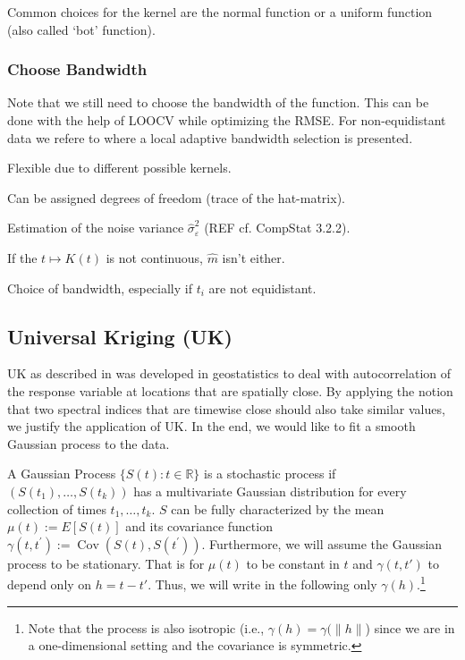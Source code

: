 		Common choices for the kernel are the normal function or a uniform function (also called `bot' function). 
		\subsubsection*{Choose Bandwidth}
		Note that we still need to choose the bandwidth of the function. This can be done with the help of LOOCV while optimizing the RMSE. For non-equidistant data we refere to \cite{brockmannLocallyAdaptiveBandwidth1993} where a local adaptive bandwidth selection is presented.

		\begin{my_pros_cons_table}{
				\item Flexible due to different possible kernels.
				\item Can be assigned degrees of freedom (trace of the hat-matrix).
				\item Estimation of the noise variance $\hat \sigma_\varepsilon^2$ (REF cf. CompStat 3.2.2).
			}{
				\item If the $t \mapsto K(t)$ is not continuous, $\hat m $ isn't either.
				\item Choice of bandwidth, especially if $t_i$ are not equidistant.
			}
		\end{my_pros_cons_table}


	\subsection{Universal Kriging (UK)}
		\label{sec:Kriging}

		UK as described in \cite{diggleGaussianModelsGeostatistical2007} was developed in geostatistics to deal with autocorrelation of the response variable at locations that are spatially close. By applying the notion that two spectral indices that are timewise close should also take similar values, we justify the application of UK. In the end, we would like to fit a smooth Gaussian process to the data.

		A Gaussian Process $\{S(t) : t\in \mathbb R\} $ is a stochastic process if $(S(t_1),\dots,S(t_k))$ has a multivariate Gaussian distribution for every collection of times ${t_1, \dots , t_k}$. $S$ can be fully characterized by the mean $\mu(t):=E[S(t)]$ and its covariance function $\gamma\left(t, t^{\prime}\right):=\operatorname{Cov}\left(S(t), S\left(t^{\prime}\right)\right)$. 
		Furthermore, we will assume the Gaussian process to be stationary. That is for $\mu(t)$ to be constant in $t$ and $\gamma(t,t')$ to depend only on $h=t-t'$. Thus, we will write in the following only $\gamma(h)$.\footnote{Note that the process is also {isotropic} (i.e., $\gamma(h)=\gamma(\|h\|$) since we are in a one-dimensional setting and the covariance is symmetric.}

